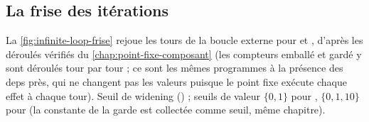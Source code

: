 \subsection{La frise des itérations}

La \cref{fig:infinite-loop-frise} rejoue les tours de la boucle externe pour  et , d'après les déroulés vérifiés du \cref{chap:point-fixe-composant} (les compteurs emballé et gardé y sont déroulés tour par tour ; ce sont les mêmes programmes à la présence des deps près, qui ne changent pas les valeurs puisque le point fixe exécute chaque effet à chaque tour). Seuil de widening  () ; seuils de valeur $\{0,1\}$ pour , $\{0,1,10\}$ pour  (la constante de la garde est collectée comme seuil, même chapitre).

